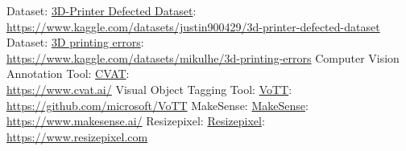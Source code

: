 \documentclass[12pt,a4paper]{article}
\begin{document}
\begin{thebibliography}{9}

        Dataset: \href{https://www.kaggle.com/datasets/justin900429/3d-printer-defected-dataset}{3D-Printer Defected Dataset}: \\
        {\footnotesize \url{https://www.kaggle.com/datasets/justin900429/3d-printer-defected-dataset}}
        Dataset: \href{https://www.kaggle.com/datasets/mikulhe/3d-printing-errors}{3D printing errors}: \\
        {\footnotesize \url{https://www.kaggle.com/datasets/mikulhe/3d-printing-errors}}
        Computer Vision Annotation Tool: \href{https://www.cvat.ai/}{CVAT}: \\
        {\footnotesize \url{https://www.cvat.ai/}}
        Visual Object Tagging Tool: \href{https://github.com/microsoft/VoTT}{VoTT}: \\
        {\footnotesize \url{https://github.com/microsoft/VoTT}}
        MakeSense: \href{https://www.makesense.ai/}{MakeSense}: \\
        {\footnotesize \url{https://www.makesense.ai/}}
    Resizepixel: \href{https://www.resizepixel.com}{Resizepixel}: \\
        {\footnotesize \url{https://www.resizepixel.com}}

    \end{thebibliography}
\end{document}
